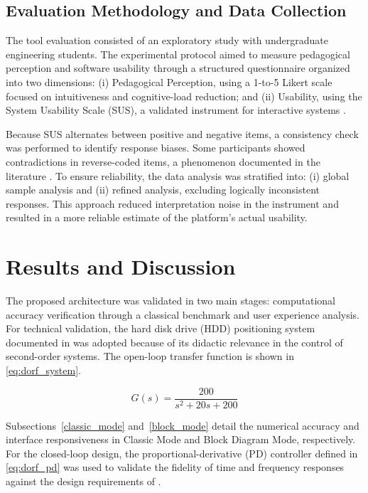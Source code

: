 \documentclass[conference]{IEEEtran}
\begin{document}
\subsection{Evaluation Methodology and Data Collection}

The tool evaluation consisted of an exploratory study with undergraduate engineering students. The experimental protocol aimed to measure pedagogical perception and software usability through a structured questionnaire organized into two dimensions: (i) Pedagogical Perception, using a 1-to-5 Likert scale focused on intuitiveness and cognitive-load reduction; and (ii) Usability, using the System Usability Scale (SUS), a validated instrument for interactive systems \cite{brooke1996sus}.

Because SUS alternates between positive and negative items, a consistency check was performed to identify response biases. Some participants showed contradictions in reverse-coded items, a phenomenon documented in the literature \cite{lewis2009factor}. To ensure reliability, the data analysis was stratified into: (i) global sample analysis and (ii) refined analysis, excluding logically inconsistent responses. This approach reduced interpretation noise in the instrument and resulted in a more reliable estimate of the platform's actual usability.

\section{Results and Discussion}

The proposed architecture was validated in two main stages: computational accuracy verification through a classical benchmark and user experience analysis. For technical validation, the hard disk drive (HDD) positioning system documented in \cite{dorf2017} was adopted because of its didactic relevance in the control of second-order systems. The open-loop transfer function is shown in \eqref{eq:dorf_system}.

\begin{equation}
G(s) = \frac{200}{s^2 + 20s + 200}
\label{eq:dorf_system}
\end{equation}

Subsections~\ref{classic_mode} and~\ref{block_mode} detail the numerical accuracy and interface responsiveness in Classic Mode and Block Diagram Mode, respectively. For the closed-loop design, the proportional-derivative (PD) controller defined in \eqref{eq:dorf_pd} was used to validate the fidelity of time and frequency responses against the design requirements of \cite{dorf2017}.
\end{document}
